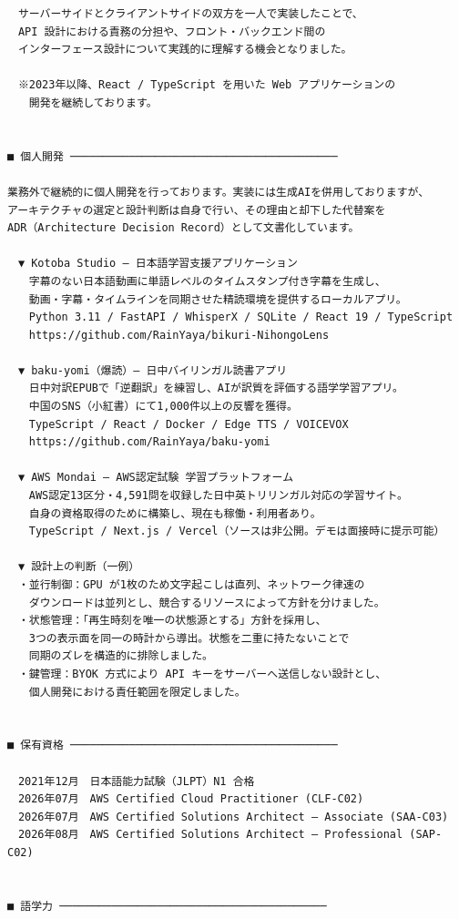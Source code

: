 \documentclass[paper=a4paper,fontsize=9.5pt,head_space=15mm,foot_space=15mm,gutter=18mm,fore_edge=18mm,baselineskip=15.5pt]{jlreq}
\begin{document}
\begin{Verbatim}[fontsize=\small,commandchars=\\\{\}]
　サーバーサイドとクライアントサイドの双方を一人で実装したことで、
　API 設計における責務の分担や、フロント・バックエンド間の
　インターフェース設計について実践的に理解する機会となりました。

　※2023年以降、React / TypeScript を用いた Web アプリケーションの
　　開発を継続しております。


■ 個人開発 ─────────────────────────────────────────

業務外で継続的に個人開発を行っております。実装には生成AIを併用しておりますが、
アーキテクチャの選定と設計判断は自身で行い、その理由と却下した代替案を
ADR（Architecture Decision Record）として文書化しています。

　▼ Kotoba Studio — 日本語学習支援アプリケーション
　　字幕のない日本語動画に単語レベルのタイムスタンプ付き字幕を生成し、
　　動画・字幕・タイムラインを同期させた精読環境を提供するローカルアプリ。
　　Python 3.11 / FastAPI / WhisperX / SQLite / React 19 / TypeScript
　　https://github.com/RainYaya/bikuri-NihongoLens

　▼ baku-yomi（爆読）— 日中バイリンガル読書アプリ
　　日中対訳EPUBで「逆翻訳」を練習し、AIが訳質を評価する語学学習アプリ。
　　中国のSNS（小紅書）にて1,000件以上の反響を獲得。
　　TypeScript / React / Docker / Edge TTS / VOICEVOX
　　https://github.com/RainYaya/baku-yomi

　▼ AWS Mondai — AWS認定試験 学習プラットフォーム
　　AWS認定13区分・4,591問を収録した日中英トリリンガル対応の学習サイト。
　　自身の資格取得のために構築し、現在も稼働・利用者あり。
　　TypeScript / Next.js / Vercel（ソースは非公開。デモは面接時に提示可能）

　▼ 設計上の判断（一例）
　・並行制御：GPU が1枚のため文字起こしは直列、ネットワーク律速の
　　ダウンロードは並列とし、競合するリソースによって方針を分けました。
　・状態管理：「再生時刻を唯一の状態源とする」方針を採用し、
　　3つの表示面を同一の時計から導出。状態を二重に持たないことで
　　同期のズレを構造的に排除しました。
　・鍵管理：BYOK 方式により API キーをサーバーへ送信しない設計とし、
　　個人開発における責任範囲を限定しました。


■ 保有資格 ─────────────────────────────────────────

　2021年12月　日本語能力試験（JLPT）N1 合格
　2026年07月　AWS Certified Cloud Practitioner (CLF-C02)
　2026年07月　AWS Certified Solutions Architect – Associate (SAA-C03)
　2026年08月　AWS Certified Solutions Architect – Professional (SAP-C02)


■ 語学力 ─────────────────────────────────────────


\end{Verbatim}
\end{document}

